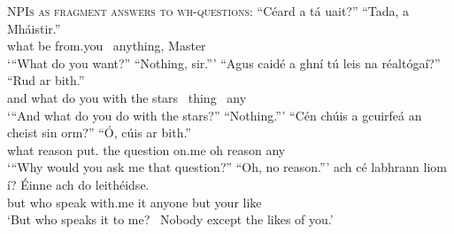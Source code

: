 \documentclass[output=paper,colorlinks,citecolor=brown]{langscibook}
\begin{document}
\ea\label{ex:npiwh}
{\scshape NPIs as fragment answers to wh-questions}:
\ea
\gll “Céard a tá uait?” “Tada, a Mháistir.” \\
     what {\aLgloss} {be\pres} from.you {\ anything}, {\voca} Master \label{ex:ll} \\
\glt `“What do you want?” {\quad}“Nothing, sir.”'
\ex
\gll “Agus caidé a ghní tú leis na réaltógaí?” “Rud {ar bith}.” \\
     and  what {\aLgloss} do you with the stars {\ thing} {\ any}\\ \label{ex:petit}
\glt `“And what do you do with the stars?”  “Nothing.”'
\ex
\gll “Cén chúis a gcuirfeá an cheist sin orm?” “Ó, cúis {ar bith}.” \\
     what reason {\C} {put\cond.\your} the question {\seo} {on.me} oh reason {any}\\
\glt `“Why would you ask me that question?”  “Oh, no reason.”' \label{ex:lofrs}
\ex
\gll ach cé labhrann liom í? {\quad} Éinne ach do leithéidse. \\
     but who {speak\pres} with.me it {} anyone but your like \\ \label{ex:tmgb}
\glt `But who speaks it to me? \ Nobody except the likes of you.'
\z
\z
{}
\end{document}

